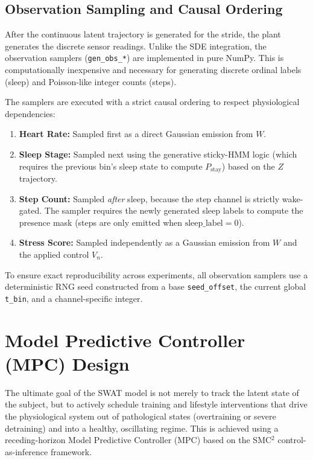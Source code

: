 \documentclass[11pt,a4paper]{article}
\begin{document}
\subsection{Observation Sampling and Causal Ordering}
After the continuous latent trajectory is generated for the stride, the plant generates the discrete sensor readings. Unlike the SDE integration, the observation samplers (\texttt{gen\_obs\_*}) are implemented in pure NumPy. This is computationally inexpensive and necessary for generating discrete ordinal labels (sleep) and Poisson-like integer counts (steps).

The samplers are executed with a strict causal ordering to respect physiological dependencies:
\begin{enumerate}
    \item \textbf{Heart Rate:} Sampled first as a direct Gaussian emission from $W$.
    \item \textbf{Sleep Stage:} Sampled next using the generative sticky-HMM logic (which requires the previous bin's sleep state to compute $P_{\text{stay}}$) based on the $Z$ trajectory.
    \item \textbf{Step Count:} Sampled \textit{after} sleep, because the step channel is strictly wake-gated. The sampler requires the newly generated sleep labels to compute the presence mask (steps are only emitted when $\text{sleep\_label} = 0$).
    \item \textbf{Stress Score:} Sampled independently as a Gaussian emission from $W$ and the applied control $V_n$.
\end{enumerate}

To ensure exact reproducibility across experiments, all observation samplers use a deterministic RNG seed constructed from a base \texttt{seed\_offset}, the current global \texttt{t\_bin}, and a channel-specific integer.

\section{Model Predictive Controller (MPC) Design}

The ultimate goal of the SWAT model is not merely to track the latent state of the subject, but to actively schedule training and lifestyle interventions that drive the physiological system out of pathological states (overtraining or severe detraining) and into a healthy, oscillating regime. This is achieved using a receding-horizon Model Predictive Controller (MPC) based on the SMC$^2$ control-as-inference framework.
\end{document}

